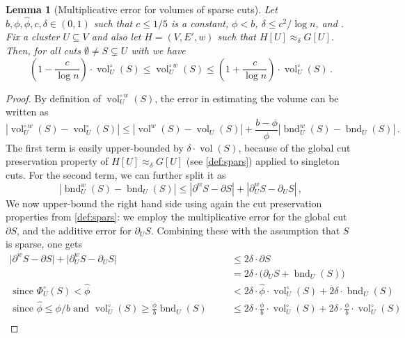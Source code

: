 \documentclass[epsfig,letter,11pt]{article}
\numberwithin{equation}{section}
\DeclareMathOperator{\vol}{vol}
\newcommand{\unbor}[2]{\operatorname{bnd}_{#2} (#1)}
\newcommand{\wbor}[2]{\operatorname{bnd}_{#2}^w (#1)}
\newcommand{\unvolc}[2]{\operatorname{vol}_{#2}^\circ (#1)}
\newcommand{\wvolc}[2]{\operatorname{vol}_{#2}^{\circ \,w} (#1)}
\newcommand{\unspc}[2]{\Phi_{#2}^\circ (#1)}
\newcommand{\wvol}[1]{\operatorname{vol}^{w} (#1)}
\newcommand{\uncut}[2]{{\partial}_{#2} #1}
\newcommand{\uncutg}[1]{{\partial} #1}
\newcommand{\wcut}[2]{\partial^w_{#2} #1}
\newcommand{\wcutg}[1]{\partial^w #1}
\renewcommand{\hat}{\widehat}
\newtheorem{lemma}[theorem]{Lemma}
\begin{document}
\begin{lemma}[Multiplicative error for volumes of sparse cuts]
	\label{lem:volumesparsecuts}
	Let $b, \phi,\hat{\phi}, c,\delta \in (0,1)$ such that $c \leq 1/5$ is a constant, $\phi < b$, $\delta \le c^2 / \log n$, and \smash{$\hat{\phi} \le \phi/b$}. Fix a cluster $U \subseteq V$ and also let $H=(V,E',w)$ such that $H[U] \approx_\delta G[U]$. Then, for all cuts $\emptyset \neq S \subsetneq U$ with \smash{$\unspc{S}{U} < \hat{\phi}$} we have
	\begin{equation*}
		\left(1-\frac{c}{\log n}\right) \cdot \unvolc{S}{U} \le \wvolc{S}{U} \le \left(1+\frac{c}{\log n}\right) \cdot \unvolc{S}{U} \, .
	\end{equation*}
\end{lemma}
\begin{proof}
	By definition of $\wvolc{S}{U}$, the error in estimating the volume can be written as
	\begin{equation}
		\left|\wvolc{S}{U}- \unvolc{S}{U}\right| \le \left|\wvol{S}- \vol_U(S)\right| + \frac{b-\phi}{\phi}\left|\wbor{S}{U} - \unbor{S}{U}\right| \, . \label{eq:triangineqselfloops}
	\end{equation}
	The first term is easily upper-bounded by $\delta \cdot \vol(S)$, because of the global cut preservation property of $H[U] \approx_\delta G[U]$ (see \cref{def:spars}) applied to singleton cuts. For the second term, we can further split it as
	\begin{equation}
		\left|\wbor{S}{U} - \unbor{S}{U}\right| \le \left|\wcutg{S}-\uncutg{S}\right|+\left|\wcut{S}{U}-\uncut{S}{U}\right| \, , \label{eq:trianginequality}
	\end{equation}
We now upper-bound the right hand side using again the cut preservation properties from \cref{def:spars}: we employ the multiplicative error for the global cut $\uncutg{S}$, and the additive error for $\uncut{S}{U}$. Combining these with the assumption that $S$ is sparse, one gets
	\begin{align}
		\Big|\wcutg{S} - \uncutg{S}\Big| + \Big|\wcut{S}{U}-\uncut{S}{U}\Big| 
		& \le  2\delta\cdot \uncutg{S} \\
		& =   2\delta \cdot\big(\uncut{S}{U} + \unbor{S}{U}\big) \\
		  \text{ since $\unspc{S}{U} < \hat{\phi}$ } \quad & <  2\delta \cdot \hat{\phi} \cdot \vol_U^\circ(S) + 2\delta \cdot \unbor{S}{U}\\
	 \text{ since $\hat{\phi} \le \phi/b$ and $\vol_U^{\circ}(S) \ge \frac{\phi}{b}\unbor{S}{U}$ } \quad & \le 2\delta \cdot \frac{\phi}{b} \cdot \vol_U^\circ(S) + 2\delta \cdot \frac{\phi}{b} \cdot \vol_U^{\circ}(S)\\

\end{align}
\end{proof}
\end{document}

